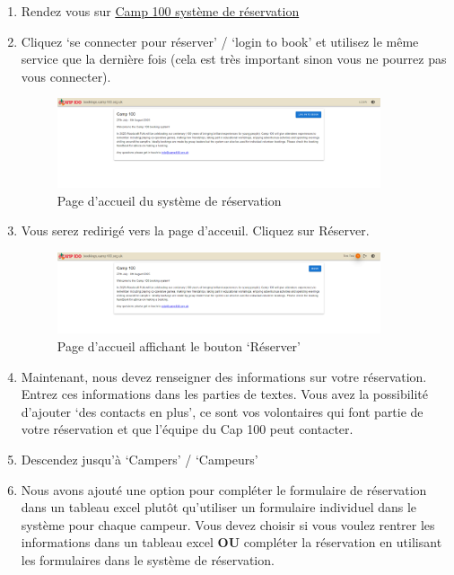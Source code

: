 \documentclass[a4paper, 11pt]{report}
\begin{document}
\begin{enumerate}
    \item Rendez vous sur \href{https://bookings.camp100.org.ukj}{Camp 100 syst\`eme de r\'eservation}
    \item Cliquez `se connecter pour r\'eserver' / `login to book' et utilisez le m\^eme service que la derni\`ere fois (cela est tr\`es important sinon vous ne pourrez pas vous connecter).
    \begin{figure}[H]
        \centering
        \includegraphics[width=0.9\textwidth]{assets/2-home-prelogin.png}
        \caption{Page d'accueil du syst\`eme de r\'eservation}
    \end{figure}
    \item Vous serez redirig\'e vers la page d'acceuil. Cliquez sur R\'eserver.
    \begin{figure}[H]
        \centering
        \includegraphics[width=0.9\textwidth]{assets/2-home-loggedin.png}
        \caption{Page d'accueil affichant le bouton `R\'eserver'}
    \end{figure}
    \item Maintenant, nous devez renseigner des informations sur votre r\'eservation. Entrez ces informations dans les parties de textes. Vous avez la possibilit\'e d'ajouter `des contacts en plus', ce sont vos volontaires qui font partie de votre r\'eservation et que l'\'equipe du Cap 100 peut contacter. 
    \item Descendez jusqu'\`a `Campers' / `Campeurs'
    \item Nous avons ajout\'e une option pour compl\'eter le formulaire de r\'eservation dans un tableau excel plutôt qu'utiliser un formulaire individuel dans le syst\`eme pour chaque campeur. Vous devez choisir si vous voulez rentrer les informations dans un tableau excel  \textbf{OU} compl\'eter la r\'eservation en utilisant les formulaires dans le syst\`eme de r\'eservation. 
    

\end{enumerate}
\end{document}
